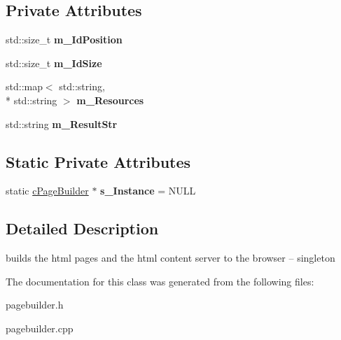 \subsection*{Private Attributes}
\begin{DoxyCompactItemize}
\item 
\hypertarget{classhttp__server_1_1cPageBuilder_a98fc3701625a6e09deb368eca4aae6da}{std\-::size\-\_\-t {\bfseries m\-\_\-\-Id\-Position}}\label{classhttp__server_1_1cPageBuilder_a98fc3701625a6e09deb368eca4aae6da}

\item 
\hypertarget{classhttp__server_1_1cPageBuilder_a2a5da5d3ab0f9f61046e2111ea36b039}{std\-::size\-\_\-t {\bfseries m\-\_\-\-Id\-Size}}\label{classhttp__server_1_1cPageBuilder_a2a5da5d3ab0f9f61046e2111ea36b039}

\item 
\hypertarget{classhttp__server_1_1cPageBuilder_aab5bd8d3bf0b336cfe4f4334f3c78126}{std\-::map$<$ std\-::string, \\*
std\-::string $>$ {\bfseries m\-\_\-\-Resources}}\label{classhttp__server_1_1cPageBuilder_aab5bd8d3bf0b336cfe4f4334f3c78126}

\item 
\hypertarget{classhttp__server_1_1cPageBuilder_afbd884fa238cbd706cd689cd7f299ea0}{std\-::string {\bfseries m\-\_\-\-Result\-Str}}\label{classhttp__server_1_1cPageBuilder_afbd884fa238cbd706cd689cd7f299ea0}

\end{DoxyCompactItemize}
\subsection*{Static Private Attributes}
\begin{DoxyCompactItemize}
\item 
\hypertarget{classhttp__server_1_1cPageBuilder_a5857987a8133c3768bac833850d12613}{static \hyperlink{classhttp__server_1_1cPageBuilder}{c\-Page\-Builder} $\ast$ {\bfseries s\-\_\-\-Instance} = N\-U\-L\-L}\label{classhttp__server_1_1cPageBuilder_a5857987a8133c3768bac833850d12613}

\end{DoxyCompactItemize}


\subsection{Detailed Description}
builds the html pages and the html content server to the browser -- singleton 

The documentation for this class was generated from the following files\-:\begin{DoxyCompactItemize}
\item 
pagebuilder.\-h\item 
pagebuilder.\-cpp\end{DoxyCompactItemize}
